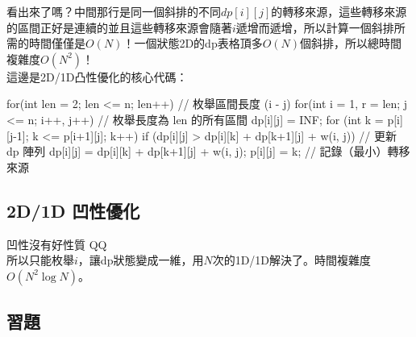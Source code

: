 	看出來了嗎？中間那行是同一個斜排的不同$dp[i][j]$的轉移來源，這些轉移來源的區間正好是連續的並且這些轉移來源會隨著$i$遞增而遞增，所以計算一個斜排所需的時間僅僅是$O(N)$！一個狀態2D的dp表格頂多$O(N)$個斜排，所以總時間複雜度$O(N^2)$！\\
	
	這邊是2D/1D凸性優化的核心代碼：\\
	
	\begin{C++}
		for(int len = 2; len <= n; len++){  // 枚舉區間長度 (i - j)
			for(int i = 1, r = len; j <= n; i++, j++){
				// 枚舉長度為 len 的所有區間
				dp[i][j] = INF;
				for (int k = p[i][j-1]; k <= p[i+1][j]; k++)
				if (dp[i][j] > dp[i][k] + dp[k+1][j] + w(i, j)){
					// 更新 dp 陣列
					dp[i][j] = dp[i][k] + dp[k+1][j] + w(i, j);
					p[i][j] = k;  // 記錄（最小）轉移來源
				}
			}
		}
	\end{C++}
	
	\subsection{2D/1D 凹性優化}
	
	凹性沒有好性質 QQ\\
	
	所以只能枚舉$i$，讓dp狀態變成一維，用$N$次的1D/1D解決了。時間複雜度$O(N^2\log N)$。
	
	\subsection{習題}
		
			